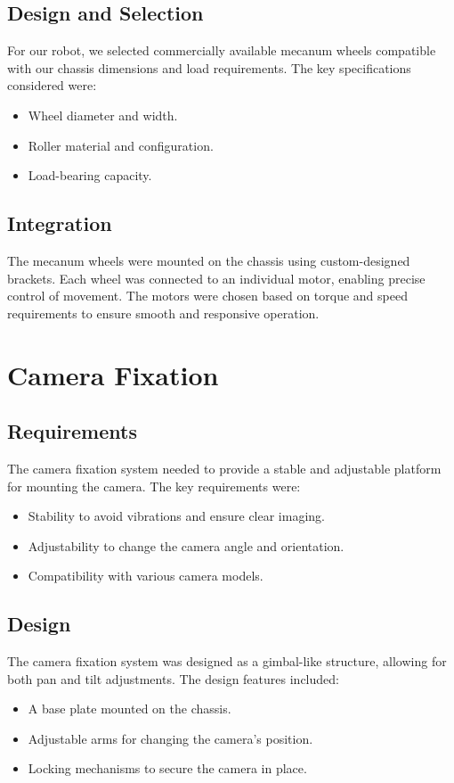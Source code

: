 \subsection{Design and Selection}
For our robot, we selected commercially available mecanum wheels compatible with our chassis
dimensions and load requirements. The key specifications considered were:
\begin{itemize}
	\item Wheel diameter and width.
	\item Roller material and configuration.
	\item  Load-bearing capacity.
\end{itemize}

\subsection{Integration}
The mecanum wheels were mounted on the chassis using custom-designed brackets. Each wheel
was connected to an individual motor, enabling precise control of movement. The motors were
chosen based on torque and speed requirements to ensure smooth and responsive operation.

\section{Camera Fixation}
\subsection{Requirements}
The camera fixation system needed to provide a stable and adjustable platform for mounting the
camera. The key requirements were:
\begin{itemize}
	\item Stability to avoid vibrations and ensure clear imaging.
	\item Adjustability to change the camera angle and orientation.
	\item Compatibility with various camera models.
\end{itemize}


\subsection{Design}
The camera fixation system was designed as a gimbal-like structure, allowing for both pan and tilt
adjustments. The design features included:
\begin{itemize}
	\item A base plate mounted on the chassis.
	\item Adjustable arms for changing the camera’s position.
	\item Locking mechanisms to secure the camera in place.
\end{itemize}


